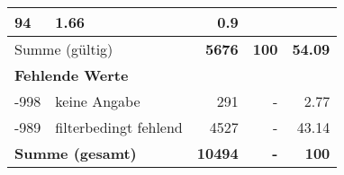 \begin{longtable}{lXrrr}
       \num{94} &
       \num[round-mode=places,round-precision=2]{1,66} &
         \num[round-mode=places,round-precision=2]{0,9} \\
     \midrule
     \multicolumn{2}{l}{Summe (gültig)} &
       \textbf{\num{5676}} &
     \textbf{100} &
       \textbf{\num[round-mode=places,round-precision=2]{54,09}} \\
     \multicolumn{5}{l}{\textbf{Fehlende Werte}}\\
       -998 &
       keine Angabe &
         \num{291} &
        - &
         \num[round-mode=places,round-precision=2]{2,77} \\
       -989 &
       filterbedingt fehlend &
         \num{4527} &
        - &
         \num[round-mode=places,round-precision=2]{43,14} \\
     \midrule
     \multicolumn{2}{l}{\textbf{Summe (gesamt)}} &
          \textbf{\num{10494}} &
        \textbf{-} &
        \textbf{100} \\
     \bottomrule
     \end{longtable}
     
